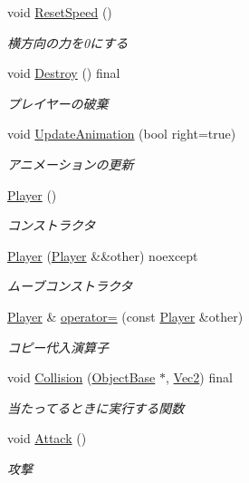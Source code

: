 \begin{DoxyCompactItemize}
void \mbox{\hyperlink{class_player_a6ddf26051788b56dd4029ba851e1f35a}{Reset\+Speed}} ()
\begin{DoxyCompactList}\small\item\em 横方向の力を0にする \end{DoxyCompactList}\item 
void \mbox{\hyperlink{class_player_af2cf4936165ef12cce96f7994e0879df}{Destroy}} () final
\begin{DoxyCompactList}\small\item\em プレイヤーの破棄 \end{DoxyCompactList}\item 
void \mbox{\hyperlink{class_player_abbb6662f1dc4ba3f75cafa6100160da0}{Update\+Animation}} (bool right=true)
\begin{DoxyCompactList}\small\item\em アニメーションの更新 \end{DoxyCompactList}\item 
\mbox{\hyperlink{class_player_affe0cc3cb714f6deb4e62f0c0d3f1fd8}{Player}} ()
\begin{DoxyCompactList}\small\item\em コンストラクタ \end{DoxyCompactList}\item 
\mbox{\hyperlink{class_player_a635af5e438af5a296c88f768e5e93eb0}{Player}} (\mbox{\hyperlink{class_player}{Player}} \&\&other) noexcept
\begin{DoxyCompactList}\small\item\em ムーブコンストラクタ \end{DoxyCompactList}\item 
\mbox{\hyperlink{class_player}{Player}} \& \mbox{\hyperlink{class_player_a8868988ae751daed5cfa32627e78889b}{operator=}} (const \mbox{\hyperlink{class_player}{Player}} \&other)
\begin{DoxyCompactList}\small\item\em コピー代入演算子 \end{DoxyCompactList}\item 
void \mbox{\hyperlink{class_player_a992b5c7e0d981308ed56706c6e71a709}{Collision}} (\mbox{\hyperlink{class_object_base}{Object\+Base}} $\ast$, \mbox{\hyperlink{common_8h_ae148fff5818e9444b4ab2288829559bf}{Vec2}}) final
\begin{DoxyCompactList}\small\item\em 当たってるときに実行する関数 \end{DoxyCompactList}\item 
void \mbox{\hyperlink{class_player_a6c879db24d39d894207e078eb4c56e8d}{Attack}} ()
\begin{DoxyCompactList}\small\item\em 攻撃 \end{DoxyCompactList}\end{DoxyCompactItemize}
